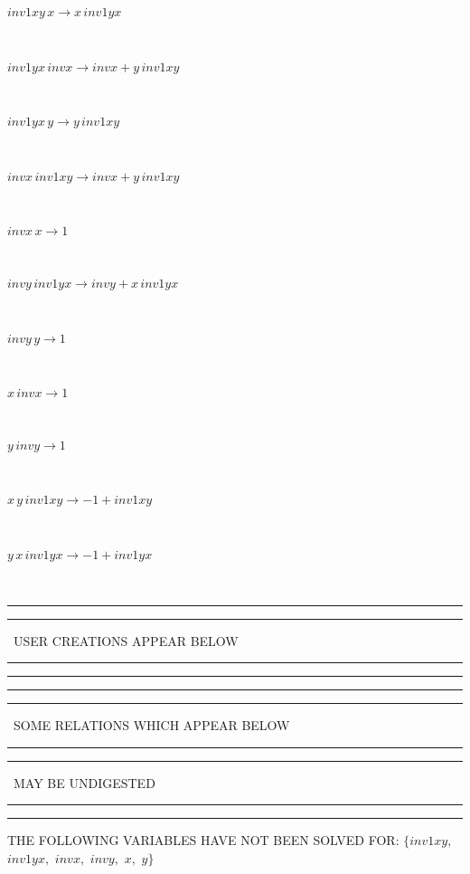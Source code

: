 \begin{minipage}{6in}
$
inv1xy\,
 x\rightarrow x\,
 inv1yx
$
\end{minipage}\medskip \\
\begin{minipage}{6in}
$
inv1yx\,
 invx\rightarrow invx + y\,
 inv1xy
$
\end{minipage}\medskip \\
\begin{minipage}{6in}
$
inv1yx\,
 y\rightarrow y\,
 inv1xy
$
\end{minipage}\medskip \\
\begin{minipage}{6in}
$
invx\,
 inv1xy\rightarrow invx + y\,
 inv1xy
$
\end{minipage}\medskip \\
\begin{minipage}{6in}
$
invx\,
 x\rightarrow 1
$
\end{minipage}\medskip \\
\begin{minipage}{6in}
$
invy\,
 inv1yx\rightarrow invy + x\,
 inv1yx
$
\end{minipage}\medskip \\
\begin{minipage}{6in}
$
invy\,
 y\rightarrow 1
$
\end{minipage}\medskip \\
\begin{minipage}{6in}
$
x\,
 invx\rightarrow 1
$
\end{minipage}\medskip \\
\begin{minipage}{6in}
$
y\,
 invy\rightarrow 1
$
\end{minipage}\medskip \\
\begin{minipage}{6in}
$
x\,
 y\,
 inv1xy\rightarrow -1 + inv1xy
$
\end{minipage}\medskip \\
\begin{minipage}{6in}
$
y\,
 x\,
 inv1yx\rightarrow -1 + inv1yx
$
\end{minipage}\\
\rule[2pt]{6in}{1pt}\hfil\break
\rule[2.5pt]{1.701in}{1pt}
\ USER CREATIONS APPEAR BELOW\ 
\rule[2.5pt]{1.701in}{1pt}\hfil\break
\rule[2pt]{6in}{1pt}\hfil\break
\rule[2pt]{6in}{4pt}\hfil\break
\rule[2pt]{1.45in}{4pt}
\ SOME RELATIONS WHICH APPEAR BELOW\ 
\rule[2pt]{1.45in}{4pt}\hfil\break
\rule[2pt]{2.18in}{4pt}
\ MAY BE UNDIGESTED\ 
\rule[2pt]{2.18in}{4pt}\hfil\break
\rule[2pt]{6in}{4pt}\hfil\break
THE FOLLOWING VARIABLES HAVE NOT BEEN SOLVED FOR:\hfil\break
$\{inv1xy,
$ $
inv1yx,
$ $
invx,
$ $
invy,
$ $
x,
$ $
y\}$
\smallskip\\
\vspace{10pt}

